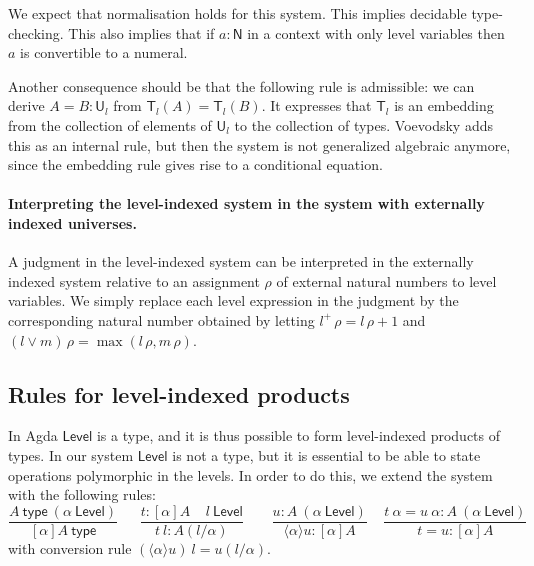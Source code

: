\documentclass[11pt,a4paper]{article}
\theoremstyle{definition}
\newcommand{\lam}[1]{{\langle}#1{\rangle}}
\newcommand{\Id}{\mathsf{Id}}
\newcommand{\NN}{\mathsf{N}}
\newcommand{\UU}{\mathsf{U}}
\newcommand{\Level}{\mathsf{Level}}
\newcommand{\type}{\mathsf{type}}
\newcommand{\T}{\mathsf{T}}
\newcommand{\ua}{\mathsf{ua}}
\newcommand{\UA}{\mathsf{UA}}
\begin{document}
%
%
%
%
%
%
%

 We expect that normalisation holds for this system.
 This implies decidable type-checking. This also implies that if $a : \NN$ in a context with only level variables
then $a$ is convertible to a numeral.

Another consequence should be that the following rule is admissible:
we can derive $A = B : \UU_l$ from $\T_l(A) = \T_l(B)$.
 It expresses that $\T_l$ is an embedding from the collection of elements of $\UU_l$
 to the collection of types.
 Voevodsky \cite[Rule 20 on p. 17]{VV} adds this as an internal rule, but then the system is not
 generalized algebraic anymore, since the embedding rule gives rise to a conditional equation.





\paragraph{Interpreting the level-indexed system in the system with externally indexed universes.}

A judgment in the level-indexed system can be interpreted in the externally indexed system relative to an assignment $\rho$ of external natural numbers to level variables. We simply replace each level expression in the judgment by the corresponding natural number obtained by letting $l^+\,\rho = l\,\rho+1$ and $(l \vee m)\,\rho = \max(l\,\rho,m\,\rho)$.

\subsection*{Rules for level-indexed products}

In Agda $\Level$ is a type,
and it is thus possible to form level-indexed products of types.
In our system $\Level$ is not a type, but it is essential to be able to state operations polymorphic
in the levels. In order to do this, we extend the system with the following rules:
$$
\frac{A~\type~(\alpha~\Level)}{[\alpha]A~\type}~~~~~~~
\frac{t:[\alpha]A~~~~~l~\Level}
     {t~l:A(l/\alpha)}~~~~~~~~~
\frac{u:A~(\alpha~\Level)}{\lam{\alpha}{u}: [\alpha]A}~~~~~
\frac{t~\alpha = u~\alpha:A~(\alpha~\Level)}{t = u:[\alpha]A}
$$
with conversion rule $(\lam{\alpha}{u})~l = u(l/\alpha)$.
\end{document}

